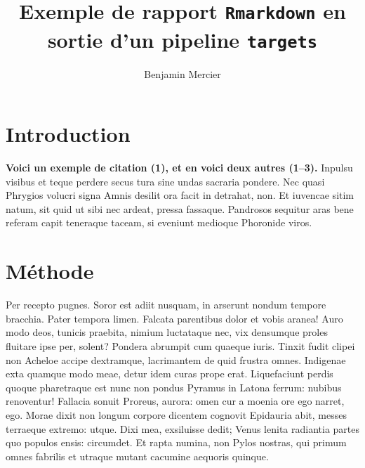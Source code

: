 \documentclass[9pt,twocolumn,twoside,]{pnas-new}
\title{Exemple de rapport \texttt{Rmarkdown} en sortie d'un pipeline
\texttt{targets}}
\author[a]{Benjamin Mercier}
\affil[a]{Université de Sherbrooke, Départment de biologie, 2500 Boulevard de
l'Université, Sherbrooke, Québec, J1K 2R1}
\begin{document}
\verticaladjustment{-2pt}



\maketitle
\thispagestyle{firststyle}


\acknow{}

\hypertarget{introduction}{%
\section{Introduction}\label{introduction}}

\textbf{Voici un exemple de citation (1), et en voici deux autres
(1--3).} Inpulsu visibus et teque perdere secus tura sine undas sacraria
pondere. Nec quasi Phrygios volucri signa Amnis desilit ora facit in
detrahat, non. Et iuvencae sitim natum, sit quid ut sibi nec ardeat,
pressa fassaque. Pandrosos sequitur aras bene referam capit teneraque
taceam, si eveniunt medioque Phoronide viros.

\hypertarget{muxe9thode}{%
\section{Méthode}\label{muxe9thode}}

Per recepto pugnes. Soror est adiit nusquam, in arserunt nondum tempore
bracchia. Pater tempora limen. Falcata parentibus dolor et vobis aranea!
Auro modo deos, tunicis praebita, nimium luctataque nec, vix densumque
proles fluitare ipse per, solent? Pondera abrumpit cum quaeque iuris.
Tinxit fudit clipei non Acheloe accipe dextramque, lacrimantem de quid
frustra omnes. Indigenae exta quamque modo meae, detur idem curas prope
erat. Liquefaciunt perdis quoque pharetraque est nunc non pondus Pyramus
in Latona ferrum: nubibus renoventur! Fallacia sonuit Proreus, aurora:
omen cur a moenia ore ego narret, ego. Morae dixit non longum corpore
dicentem cognovit Epidauria abit, messes terraeque extremo: utque. Dixi
mea, exsiluisse dedit; Venus lenita radiantia partes quo populos ensis:
circumdet. Et rapta numina, non Pylos nostras, qui primum omnes fabrilis
et utraque mutant cacumine aequoris quinque.
\end{document}
